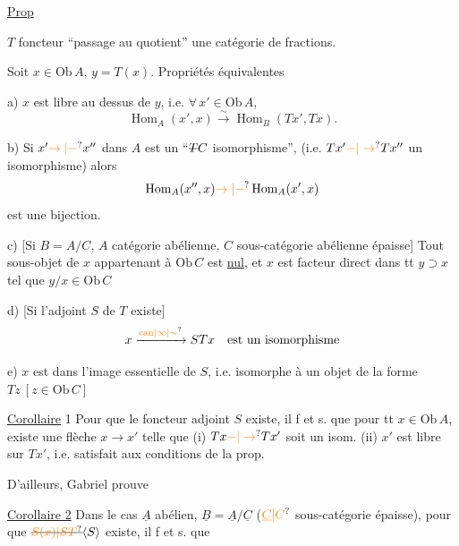 \uline{Prop}


$T$ foncteur ``passage au quotient''  une catégorie de fractions.

Soit $x\in\mathrm{Ob}\,A$, $y=T(x)$. Propriétés équivalentes

a) $x$ est libre au dessus de $y$, i.e. $\forall\,x'\in\mathrm{Ob}\,A$,
\[
\operatorname{Hom}_{A}(x',x)\xrightarrow{\sim}\operatorname{Hom}_{B}(Tx',Tx).
\]

b) Si $x'\unsure{\to|-}x''$ dans $A$ est un ``$\deleted{T}C$ isomorphisme'', (i.e. $Tx'\unsure{-|\to}Tx''$ un isomorphisme) alors
\[
\operatorname{Hom}_{A}(x'',x)\unsure{\to|-}\operatorname{Hom}_{A}(x',x)
\]
est une bijection.

c) [Si $B=A/C$, $A$ catégorie abélienne, $C$ sous-catégorie abélienne épaisse] Tout sous-objet de $x$ appartenant à $\mathrm{Ob}\,C$ est \uline{nul}, et $x$ est facteur direct dans tt $y\supset x$ tel que $y/x\in\mathrm{Ob}\,C$

d) [Si l'adjoint $S$ de $T$ existe]
\[
x\xrightarrow{\unsure{\mathrm{can}|\infty|\sim}}STx\quad\text{est un isomorphisme}
\]

e)  $x$ est dans l'image essentielle de $S$, i.e. isomorphe à un objet de la forme $Tz\ [z\in\mathrm{Ob}\,C]$




\uline{Corollaire} 1 Pour que le foncteur adjoint $S$ existe, il f et s. que pour tt $x\in\mathrm{Ob}\,A$, existe une flèche $x\to x'$ telle que (i) $Tx\unsure{-|\to}Tx'$ soit un isom. (ii) $x'$ est libre sur $Tx'$, i.e. satisfait aux conditions de la prop.

D'ailleurs, Gabriel prouve

\uline{Corollaire 2}  Dans le cas $\underline A$ abélien, $\underline B=\underline A/\underline C$ ($\unsure{\underline C|C}$ sous-catégorie épaisse), pour que $\deleted{\unsure{S(x)|ST}}\inserted{S}$ existe, il f et s. que

